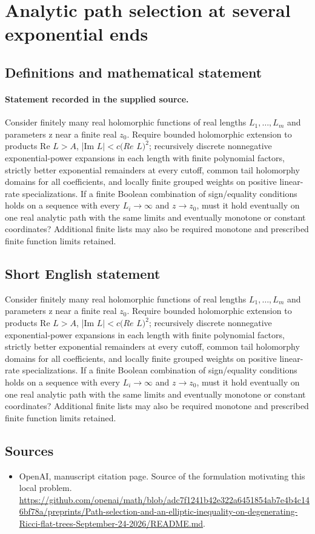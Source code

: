 \documentclass[11pt]{article}
\begin{document}
\section*{Analytic path selection at several exponential ends}\label{statement}
\subsection{Definitions and mathematical statement}
\paragraph{Statement recorded in the supplied source.}
Consider finitely many real holomorphic functions of real lengths $L_{1},\dots ,L_m$ and parameters z near a finite real $z_{0}$. Require bounded holomorphic extension to products Re $L>A$, |Im $L|<c(Re$ $L)^{2}$; recursively discrete nonnegative exponential-power expansions in each length with finite polynomial factors, strictly better exponential remainders at every cutoff, common tail holomorphy domains for all coefficients, and locally finite grouped weights on positive linear-rate specializations. If a finite Boolean combination of sign/equality conditions holds on a sequence with every $L_i\to \infty $ and $z\to z_{0}$, must it hold eventually on one real analytic path with the same limits and eventually monotone or constant coordinates? Additional finite lists may also be required monotone and prescribed finite function limits retained.
\subsection{Short English statement}
Consider finitely many real holomorphic functions of real lengths $L_{1},\dots ,L_m$ and parameters z near a finite real $z_{0}$. Require bounded holomorphic extension to products Re $L>A$, |Im $L|<c(Re$ $L)^{2}$; recursively discrete nonnegative exponential-power expansions in each length with finite polynomial factors, strictly better exponential remainders at every cutoff, common tail holomorphy domains for all coefficients, and locally finite grouped weights on positive linear-rate specializations. If a finite Boolean combination of sign/equality conditions holds on a sequence with every $L_i\to \infty $ and $z\to z_{0}$, must it hold eventually on one real analytic path with the same limits and eventually monotone or constant coordinates? Additional finite lists may also be required monotone and prescribed finite function limits retained.
\subsection{Sources}
\begin{itemize}
\item[S1] OpenAI, manuscript citation page. Source of the formulation motivating this local problem.
\url{https://github.com/openai/math/blob/adc7f1241b42e322a6451854ab7e4b4c146bf78a/preprints/Path-selection-and-an-elliptic-inequality-on-degenerating-Ricci-flat-trees-September-24-2026/README.md}.
\end{itemize}
\end{document}
